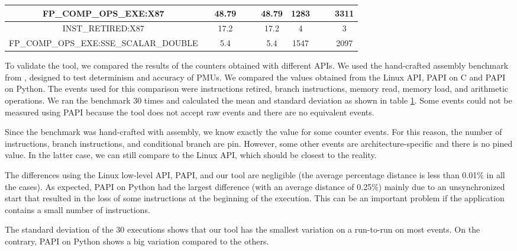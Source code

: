 \begin{table}[h]
{\begin{tabular}{|c|c|c|c|c|c|c|c|c|c|}
FP\_COMP\_OPS\_EXE:X87                 &              & 48.79     &      &             & 48.79   & 1283      &      &             & 3311   \\ \hline
INST\_RETIRED:X87                      &              & 17.2      &      &             & 17.2    & 4         &      &             & 3      \\ \hline
FP\_COMP\_OPS\_EXE:SSE\_SCALAR\_DOUBLE &              & 5.4       &      &             & 5.4     & 1547      &      &             & 2097   \\ \hline
\end{tabular}
}
\label{tab:counters}
\end{table}

To validate the tool, we compared the results of the counters obtained with different APIs. 
We used the hand-crafted assembly benchmark from \cite{Weaver2013a}, designed to test determinism and accuracy of PMUs.
We compared the values obtained from the Linux API, PAPI on C and PAPI on Python. 
The events used for this comparison were instructions retired, branch instructions, memory read, memory load, and arithmetic operations.
We ran the benchmark 30 times and calculated the mean and standard deviation as shown in table \ref{tab:counters}. Some events could not be measured using PAPI because the tool does not accept raw events and there are no equivalent events.

Since the benchmark was hand-crafted with assembly, we know exactly the value for some counter events. 
For this reason, the number of instructions, branch instructions, and conditional branch are pin. However, some other events are architecture-specific and there is no pined value. 
In the latter case, we can still compare to the Linux API, which should be closest to the reality.

The differences using the Linux low-level API, PAPI, and our tool are negligible (the average percentage distance is less than 0.01\% in all the cases). 
As expected, PAPI on Python had the largest difference (with an average distance of 0.25\%) mainly due to an unsynchronized start that resulted in the loss of some instructions at the beginning of the execution. 
This can be an important problem if the application contains a small number of instructions.

The standard deviation of the 30 executions shows that our tool has the smallest variation on a run-to-run on most events. On the contrary, PAPI on Python shows a big variation compared to the others.

